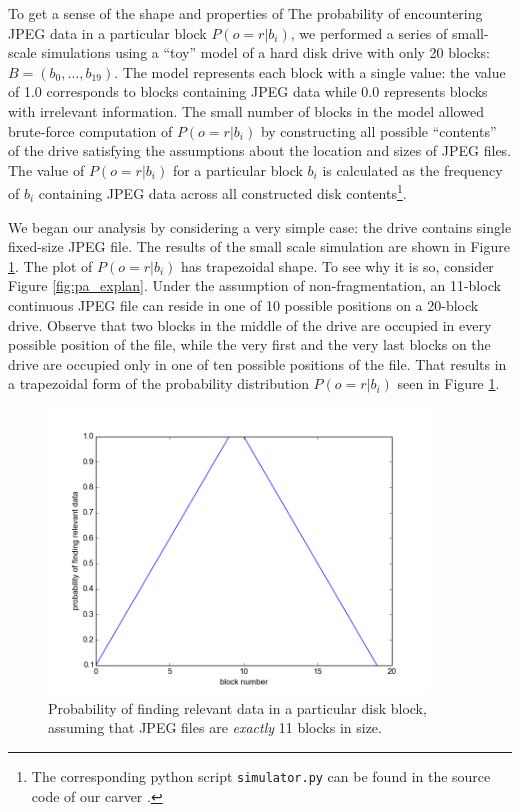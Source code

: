 \documentclass[final,5p,times,twocolumn,authoryear]{elsarticle}
\begin{document}
To get a sense of the shape and properties of The probability of encountering JPEG  data in a particular block $P(o=r | b_i)$, we performed a series of small-scale simulations using a ``toy'' model of a hard disk drive with only 20 blocks: $B=(b_0,\dots,b_{19})$. The model represents each block with a single value: the value of 1.0 corresponds to blocks containing JPEG data while 0.0 represents blocks with irrelevant information. The small number of blocks in the model allowed brute-force computation of $P(o=r | b_i)$ by constructing all possible ``contents'' of the drive satisfying the assumptions about the location and sizes of JPEG files. The value of  $P(o=r | b_i)$ for a particular block $b_i$ is calculated as the frequency of $b_i$ containing JPEG data across all constructed disk contents\footnote{The corresponding python script \texttt{simulator.py} can be found in the source code of our carver \citep{gladyshevjames2015}.}.

We began our analysis by considering a very simple case: the drive contains single fixed-size JPEG file. The results of the small scale simulation are shown in Figure \ref{fig:fig-20blk-11min-11max2d}. The plot of $P(o=r|b_i)$ has trapezoidal shape. To see why it is so, consider Figure \ref{fig:pa_explan}. Under the assumption of non-fragmentation, an 11-block continuous JPEG file can reside in one of 10 possible positions on a 20-block drive. Observe that two blocks in the middle of the drive are occupied in every possible position of the file, while the very first and the very last blocks on the drive are occupied only in one of ten possible positions of the file. That results in a trapezoidal form of the probability distribution $P(o=r|b_i)$ seen in Figure \ref{fig:fig-20blk-11min-11max2d}.

\begin{figure}
  \centerline{\includegraphics[width=0.9\textwidth]{figures/fig-20blk-11min-11max2d}}
  \caption{Probability of finding relevant data in a particular disk block, assuming that JPEG files are \emph{exactly} 11 blocks in size.}
  \label{fig:fig-20blk-11min-11max2d}
\end{figure}
\end{document}
